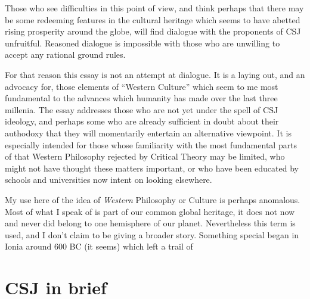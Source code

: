\documentclass[10pt,titlepage]{article}
\begin{document}
Those who see difficulties in this point of view, and think perhaps that there may be some redeeming features in the cultural heritage which seems to have abetted rising prosperity around the globe, will find dialogue with the proponents of CSJ unfruitful.
Reasoned dialogue is impossible with those who are unwilling to accept any rational ground rules.

For that reason this essay is not an attempt at dialogue.
It is a laying out, and an advocacy for, those elements of ``Western Culture'' which seem to me most fundamental to the advances which humanity has made over the last three millenia.
The essay addresses those who are not yet under the spell of CSJ ideology, and perhaps some who are already sufficient in doubt about their authodoxy that they will momentarily entertain an alternative viewpoint.
It is especially intended for those whose familiarity with the most fundamental parts of that Western Philosophy rejected by Critical Theory may be limited, who might not have thought these matters important, or who have been educated by schools and universities now intent on looking elsewhere.

My use here of the idea of {\it Western} Philosophy or Culture is perhaps anomalous.
Most of what I speak of is part of our common global heritage, it does not now and never did belong to one hemisphere of our planet.
Nevertheless this term is used, and I don't claim to be giving a broader story.
Something special began in Ionia around 600 BC (it seems) which left a trail of

\section{CSJ in brief}
\end{document}
